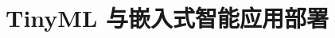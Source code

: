 \documentclass[../../main.tex]{subfiles}
\begin{document}
\chapter{TinyML 与嵌入式智能应用部署}
\label{ch:09-edge-intelligence}




\end{document}
